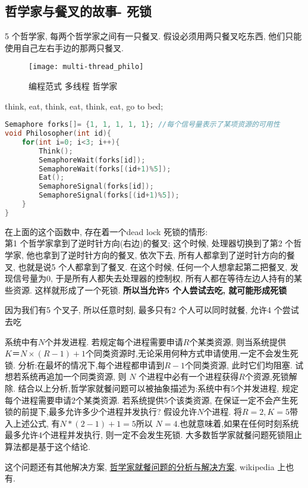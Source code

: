 \documentclass{article}
\begin{document}
\subsection{哲学家与餐叉的故事- 死锁}
5 个哲学家, 每两个哲学家之间有一只餐叉. 假设必须用两只餐叉吃东西, 他们只能使用自己左右手边的那两只餐叉.
\begin{figure}[htbp]
	\centering
	\texttt{[image: multi-thread\_philo]}\\
	\caption{编程范式 多线程 哲学家}\label{fig.multi-thread.philo}
\end{figure}

think, eat, think, eat, think, eat, go to bed;
\begin{lstlisting}[language = C]
Semaphore forks[]= {1, 1, 1, 1, 1}; //每个信号量表示了某项资源的可用性
void Philosopher(int id){
	for(int i=0; i<3; i++){
		Think();
		SemaphoreWait(forks[id]);
		SemaphoreWait(forks[(id+1)%5]);
		Eat();
		SemaphoreSignal(forks[id]);
		SemaphoreSignal(forks[(id+1)%5]);
	}
}
\end{lstlisting}
在上面的这个函数中, 存在着一个dead lock 死锁的情形:\\
第1 个哲学家拿到了逆时针方向(右边)的餐叉; 这个时候, 处理器切换到了第2 个哲学家, 他也拿到了逆时针方向的餐叉, 依次下去, 所有人都拿到了逆时针方向的餐叉, 也就是说5 个人都拿到了餐叉.
在这个时候, 任何一个人想拿起第二把餐叉, 发现信号量为0, 于是所有人都失去处理器的控制权, 所有人都在等待左边人持有的某些资源. 这样就形成了一个死锁.
\textbf{所以当允许5 个人尝试去吃, 就可能形成死锁}

因为我们有5 个叉子, 所以任意时刻, 最多只有2 个人可以同时就餐, 允许4 个尝试去吃

系统中有$N$个并发进程. 若规定每个进程需要申请$R$个某类资源, 则当系统提供$K＝N \times (R-1)+1$个同类资源时,无论采用何种方式申请使用,一定不会发生死锁.
分析:在最坏的情况下,每个进程都申请到$R-1$个同类资源, 此时它们均阻塞. 试想若系统再追加一个同类资源, 则 $N$ 个进程中必有一个进程获得$R$个资源,死锁解除.
结合以上分析,哲学家就餐问题可以被抽象描述为:系统中有$5$个并发进程, 规定每个进程需要申请$2$个某类资源. 若系统提供5个该类资源, 在保证一定不会产生死锁的前提下,最多允许多少个进程并发执行?
假设允许$N$个进程. 将$R=2,K=5$带入上述公式, 有$N*(2-1)+1=5$所以 $N=4$.也就意味着,如果在任何时刻系统最多允许$4$个进程并发执行, 则一定不会发生死锁.
大多数哲学家就餐问题死锁阻止算法都是基于这个结论.

这个问题还有其他解决方案, \href{http://blog.csdn.net/Sunflowerfiona/article/details/52756819}{哲学家就餐问题的分析与解决方案}, wikipedia 上也有.
\end{document}
